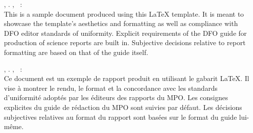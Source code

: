 \clearpage


\authorsofthereport, \publicationyearofthereport. \titleofthereport, \journalofthereport\ \serialofthereport: \pagesofthereport\\

This is a sample document produced using this LaTeX template. It is meant to showcase the template's aesthetics and formatting as well as compliance with DFO editor standards of uniformity. Explicit requirements of the DFO guide for production of science reports are built in. Subjective decisions relative to report formatting are based on that of the guide itself.

\vfill


\authorsofthereport, \publicationyearofthereport. \titleofthereport, \journalofthereport\ \serialofthereport: \pagesofthereport\\

Ce document est un exemple de rapport produit en utilisant le gabarit LaTeX. Il vise à montrer le rendu, le format et la concordance avec les standards d'uniformité adoptés par les éditeurs des rapports du MPO. Les consignes explicites du guide de rédaction du MPO sont suivies par défaut. Les décisions subjectives relatives au format du rapport sont basées sur le format du guide lui-même.

\vfill